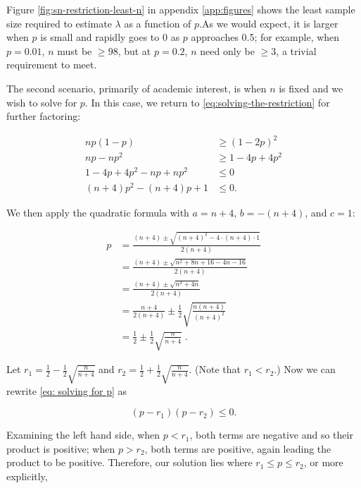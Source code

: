 \documentclass{article}
\begin{document}
Figure \ref{fig:sn-restriction-least-n} in appendix \ref{app:figures} shows the
least sample size required to estimate $\lambda$ as a function of
$p$.\footnotemark As we would expect, it is larger when $p$ is small and
rapidly goes to 0 as $p$ approaches 0.5; for example, when $p = 0.01$, $n$ must
be $\geq 98$, but at $p = 0.2$, $n$ need only be $\geq 3$, a trivial
requirement to meet.


The second scenario, primarily of academic interest, is when $n$ is fixed and
we wish to solve for $p$. In this case, we return to
\eqref{eq:solving-the-restriction} for further factoring:

\begin{align}
  np(1-p) &\geq (1-2p)^2 \nonumber \\
  np - np^2 &\geq 1 - 4p + 4p^2 \nonumber \\
  1 - 4p + 4p^2 - np + np^2 &\leq 0 \nonumber \\
  (n+4)p^2 - (n+4)p + 1 &\leq 0 \label{eq: solving for p}.
\end{align}

We then apply the quadratic formula with $a = n+4$, $b = -(n+4)$, and $c = 1$:

\begin{align*}
  p &= \frac{(n+4) \pm \sqrt{(n+4)^2 - 4 \cdot (n+4) \cdot 1}}{2(n+4)} \\
  &= \frac{(n+4) \pm \sqrt{n^2 + 8n + 16 - 4n - 16}}{2(n+4)} \\
  &= \frac{(n+4) \pm \sqrt{n^2 + 4n}}{2(n+4)} \\
  &= \frac{n+4}{2(n+4)} \pm \frac12 \sqrt{\frac{n(n+4)}{(n+4)^2}} \\
  &= \frac12 \pm \frac12 \sqrt{\frac{n}{n+4}} \;.
\end{align*}

Let $r_1 = \frac12 - \frac12 \sqrt{\frac{n}{n+4}}$ and $r_2 = \frac12 + \frac12
\sqrt{\frac{n}{n+4}}$. (Note that $r_1 < r_2$.) Now we can rewrite \eqref{eq:
solving for p} as

\begin{equation*}
  (p - r_1)(p - r_2) \leq 0.
\end{equation*}

Examining the left hand side, when $p < r_1$, both terms are negative and so
their product is positive; when $p > r_2$, both terms are positive, again
leading the product to be positive. Therefore, our solution lies where $r_1
\leq p \leq r_2$, or more explicitly,
\end{document}
